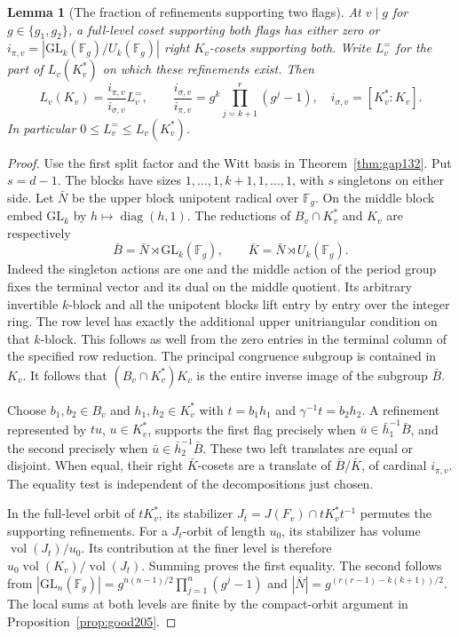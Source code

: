 \documentclass[a4paper,11pt]{article}
\newtheorem{lemma}[proposition]{Lemma}
\theoremstyle{definition}
\theoremstyle{remark}
\numberwithin{equation}{section}
\begin{document}
\begin{lemma}[The fraction of refinements supporting two flags]
\label{lem:flags211}
At \(v\mid g\) for \(g\in\{g_1,g_2\}\), a full-level coset
supporting both flags has either zero or
\(i_{\pi,v}=|\mathrm{GL}_k(\mathbb F_g)/U_k(\mathbb F_g)|\)
right \(K_v\)-cosets supporting both. Write \(L_v^{=}\) for the
part of \(L_v(K_v^*)\) on which these refinements exist. Then
\begin{equation}
 L_v(K_v)=\frac{i_{\pi,v}}{i_{\sigma,v}}L_v^{=},\qquad
 \frac{i_{\sigma,v}}{i_{\pi,v}}=
            g^k\prod_{j=k+1}^r(g^j-1),\quad
 i_{\sigma,v}=[K_v^*:K_v].
 \label{eq:fraction211}
\end{equation}
In particular \(0\le L_v^{=}\le L_v(K_v^*)\).
\end{lemma}
\begin{proof}
Use the first split factor and the Witt basis in
Theorem~\ref{thm:gap132}. Put \(s=d-1\). The blocks have sizes
\(1,\ldots,1,k+1,1,\ldots,1\), with \(s\) singletons on either
side. Let \(\bar N\) be the upper block unipotent radical over
\(\mathbb F_g\). On the middle block embed \(\mathrm{GL}_k\)
by \(h\mapsto\operatorname{diag}(h,1)\). The reductions of
\(B_v\cap K_v^*\) and \(K_v\) are respectively
\[
 \bar B=\bar N\rtimes\mathrm{GL}_k(\mathbb F_g),
 \qquad \bar K=\bar N\rtimes U_k(\mathbb F_g).
\]
Indeed the singleton actions are one and the middle action of
the period group fixes the terminal vector and its dual on the
middle quotient. Its arbitrary invertible \(k\)-block and all
the unipotent blocks lift entry by entry over the integer ring.
The row level has exactly the additional upper unitriangular
condition on that \(k\)-block. This follows as well from the
zero entries in the terminal column of the specified row reduction.
The principal congruence subgroup is contained in \(K_v\).
It follows that \((B_v\cap K_v^*)K_v\) is the entire inverse
image of the subgroup \(\bar B\).

Choose \(b_1,b_2\in B_v\) and \(h_1,h_2\in K_v^*\) with
\(t=b_1h_1\) and \(\gamma^{-1}t=b_2h_2\). A refinement represented
by \(tu\), \(u\in K_v^*\), supports the first flag precisely when
\(\bar u\in\bar h_1^{-1}\bar B\), and the second precisely when
\(\bar u\in\bar h_2^{-1}\bar B\). These two left translates are
equal or disjoint. When equal, their right \(\bar K\)-cosets are
a translate of \(\bar B/\bar K\), of cardinal \(i_{\pi,v}\).
The equality test is independent of the decompositions just chosen.

In the full-level orbit of \(tK_v^*\), its stabilizer
\(J_t=J(F_v)\cap tK_v^*t^{-1}\) permutes the supporting refinements.
For a \(J_t\)-orbit of length \(u_0\), its stabilizer has volume
\(\operatorname{vol}(J_t)/u_0\). Its contribution at the finer
level is therefore \(u_0\operatorname{vol}(K_v)/\operatorname{vol}(J_t)\).
Summing proves the first equality. The second follows from
\(|\mathrm{GL}_n(\mathbb F_g)|=g^{n(n-1)/2}\prod_{j=1}^n(g^j-1)\)
and \(|\bar N|=g^{(r(r-1)-k(k+1))/2}\). The local sums at
both levels are finite by the compact-orbit argument in
Proposition~\ref{prop:good205}.
\end{proof}
\end{document}
